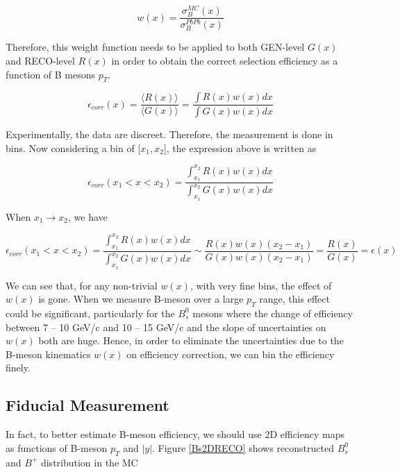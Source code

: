 \begin{equation}
w(x) = \frac{\sigma^{MC}_B (x)}{\sigma^{PbPb}_B (x)}
\end{equation}

Therefore, this weight function needs to be applied to both GEN-level $G(x)$ and RECO-level $R(x)$ in order to obtain the correct selection efficiency as a function of B mesons $p_T$. 


\begin{equation}
\epsilon_{corr}(x) =  \frac{\langle R(x) \rangle}{\langle G(x) \rangle}= \frac{\int R(x) w(x)dx}{\int G(x) w(x)dx}
\end{equation}

Experimentally, the data are discreet. Therefore, the measurement is done in bins. Now considering a bin of [$x_1,x_2$], the expression above is written as 

\begin{equation}
\epsilon_{corr}(x_1 < x < x_2) =  \frac{\int^{x_2}_{x_1} R(x) w(x)dx}{\int^{x_2}_{x_1} G(x) w(x)dx}
\end{equation}


When $x_1 \rightarrow x_2$, we have

\begin{equation}
\epsilon_{corr}(x_1 < x < x_2) =  \frac{\int^{x_2}_{x_1} R(x) w(x)dx}{\int^{x_2}_{x_1} G(x) w(x)dx} \sim  \frac{R(x) w(x)  (x_2 - x_1)}{G(x) w(x) (x_2 - x_1)}  = \frac{R(x)}{G(x)} = \epsilon(x)
\end{equation}

We can see that, for any non-trivial $w(x)$, with very fine bins, the effect of $w(x)$ is gone. When we measure B-meson over a large $p_T$ range, this effect could be significant, particularly for the $B^0_s$ mesons where the change of efficiency between 7 -- 10 GeV/c and 10 -- 15 GeV/c and the slope of uncertainties on $w(x)$ both are huge. Hence, in order to eliminate the uncertainties due to the B-meson kinematics $w(x)$ on efficiency correction, we can bin the efficiency finely.

\subsection{Fiducial Measurement}

In fact, to better estimate B-meson efficiency, we should use 2D efficiency maps as functions of B-meson $p_T$ and $|y|$. Figure \ref{Bs2DRECO} shows reconstructed $B^0_s$ and $B^+$ distribution in the MC

